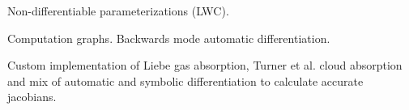     \stopsubsection

    \startsubsection[title=Symbolic Differentiation]

        Non-differentiable parameterizations (LWC).

    \stopsubsection

    \startsubsection[title=Automatic Differentiation]

        Computation graphs. Backwards mode automatic differentiation.
        
    \stopsubsection

\stopsection


\startsection[title=A Numerical Model]

    Custom implementation of Liebe gas absorption, Turner et al. cloud
    absorption and mix of automatic and symbolic differentiation to calculate
    accurate jacobians.

\stopsection

